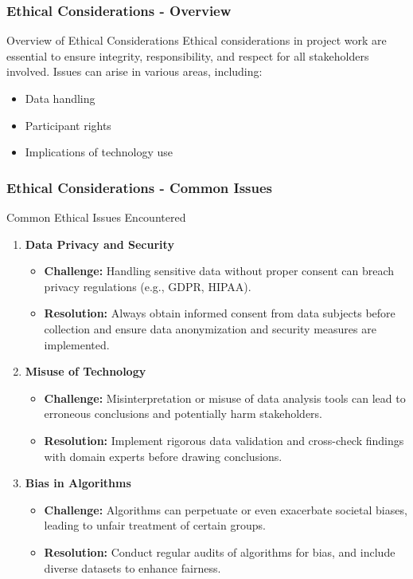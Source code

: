 \documentclass[aspectratio=169]{beamer}
\begin{document}
\begin{frame}[fragile]
    \frametitle{Ethical Considerations - Overview}
    \begin{block}{Overview of Ethical Considerations}
        Ethical considerations in project work are essential to ensure integrity, responsibility, and respect for all stakeholders involved. Issues can arise in various areas, including:
        \begin{itemize}
            \item Data handling
            \item Participant rights
            \item Implications of technology use
        \end{itemize}
    \end{block}
\end{frame}

\begin{frame}[fragile]
    \frametitle{Ethical Considerations - Common Issues}
    \begin{block}{Common Ethical Issues Encountered}
        \begin{enumerate}
            \item \textbf{Data Privacy and Security}
            \begin{itemize}
                \item \textbf{Challenge:} Handling sensitive data without proper consent can breach privacy regulations (e.g., GDPR, HIPAA).
                \item \textbf{Resolution:} Always obtain informed consent from data subjects before collection and ensure data anonymization and security measures are implemented.
            \end{itemize}
            \item \textbf{Misuse of Technology}
            \begin{itemize}
                \item \textbf{Challenge:} Misinterpretation or misuse of data analysis tools can lead to erroneous conclusions and potentially harm stakeholders.
                \item \textbf{Resolution:} Implement rigorous data validation and cross-check findings with domain experts before drawing conclusions.
            \end{itemize}
            \item \textbf{Bias in Algorithms}
            \begin{itemize}
                \item \textbf{Challenge:} Algorithms can perpetuate or even exacerbate societal biases, leading to unfair treatment of certain groups.
                \item \textbf{Resolution:} Conduct regular audits of algorithms for bias, and include diverse datasets to enhance fairness.
            \end{itemize}
        \end{enumerate}
    \end{block}
\end{frame}
\end{document}
